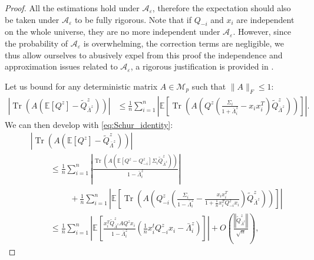 \documentclass{ws-rmta}
\DeclareMathOperator{\tr}{Tr}
\begin{document}
\begin{proof}
  All the estimations hold under $\mathcal A_\varepsilon$, therefore the expectation should also be taken under $\mathcal A_\varepsilon$ to be fully rigorous. Note that if $Q_{-i}$ and $x_i$ are independent on the whole universe, they are no more independent under $\mathcal A_\varepsilon$. However, since the probability of $\mathcal A_\varepsilon$ is overwhelming, the correction terms are negligible, we thus allow ourselves to abusively expel from this proof the independence and approximation issues related to $\mathcal A_\varepsilon$, a rigorous justification is provided in \cite{LOU21RHL}.

  Let us bound for any deterministic matrix $A \in \mathcal{M}_{p}$ such that $\|A\|_F\leq 1$:
  \begin{align*}
   \left\vert  \tr \left( A  \left( \mathbb E[Q^z] - \tilde Q^z_{\bar \Lambda^z} \right) \right) \right\vert
    &\leq \frac{1}{n} \sum_{i=1}^n \left\vert \mathbb E \left[ \tr \left( A \left( Q^z \left( \frac{\Sigma_i}{1+\bar \Lambda^z_i} - x_ix_i^T \right)\tilde Q^z_{\bar \Lambda^z} \right) \right) \right] \right\vert.
  \end{align*}
  We can then develop with \eqref{eq:Schur_identity}:
  \begin{align*}
    &\left\vert  \tr \left( A \left( \mathbb E[Q^z] - \tilde Q^z_{\bar \Lambda^z} \right) \right) \right\vert\\
    &\hspace{1cm}\leq \frac{1}{n} \sum_{i=1}^n \left\vert   \frac{ \tr \left( A \left( \mathbb E \left[ Q^z - Q_{-i}^z  \right]\Sigma_i\tilde Q^z_{\bar \Lambda^z} \right) \right)}{1 - \bar \Lambda^z_i}  \right\vert\\
    &\hspace{1cm}\hspace{1cm} + \frac{1}{n} \sum_{i=1}^n \left\vert \mathbb E \left[ \tr \left( A \left( Q_{-i}^z \left( \frac{\Sigma_i}{1 - \bar \Lambda^z_i} - \frac{x_ix_i^T}{1 + \frac{1}{n} x_i^T Q_{-i}^z x_i} \right)\tilde Q^z_{\bar \Lambda^z} \right) \right) \right] \right\vert\\
    &\hspace{1cm}\leq \frac{1}{n} \sum_{i=1}^n \left\vert \mathbb E \left[ \frac{ x_i^T\tilde Q^z_{\bar \Lambda^z}A Q^zx_i}{1 - \bar \Lambda^z_i } \left( \frac{1}{n }x_i^t Q_{-i}^z x_i - \bar \Lambda^z_i \right)\right] \right\vert + O \left(  \frac{\left\Vert \tilde Q^z_{\bar \Lambda^z} \right\Vert}{\sqrt n}\right),

\end{align*}
\end{proof}
\end{document}
